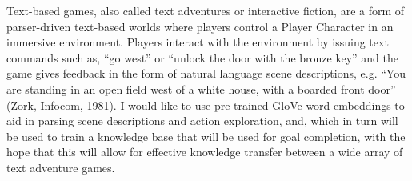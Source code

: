 Text-based games, also called text adventures or interactive
fiction, are a form of parser-driven text-based worlds where players
control a Player Character in an immersive environment. Players
interact with the environment by issuing text commands such as, ``go
west'' or ``unlock the door with the bronze key'' and the game gives
feedback in the form of natural language scene descriptions, e.g.
``You are standing in an open field west of a white house, with a
boarded front door'' (Zork, Infocom, 1981). I would like to use
pre-trained GloVe word embeddings to aid in parsing scene
descriptions and action exploration, and, which in turn will be used
to train a knowledge base that will be used for goal completion,
with the hope that this will allow for effective knowledge transfer
between a wide array of text adventure games.
